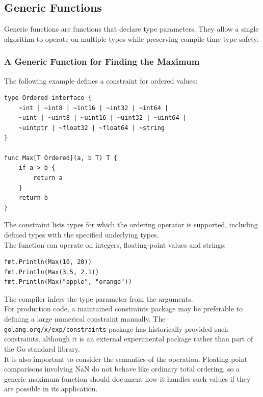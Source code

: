 \subsection{Generic Functions}

Generic functions are functions that declare type parameters. They allow a single algorithm to operate on multiple types while preserving compile-time type safety.

\subsubsection{A Generic Function for Finding the Maximum}

The following example defines a constraint for ordered values:

\begin{lstlisting}
type Ordered interface {
    ~int | ~int8 | ~int16 | ~int32 | ~int64 |
    ~uint | ~uint8 | ~uint16 | ~uint32 | ~uint64 |
    ~uintptr | ~float32 | ~float64 | ~string
}

func Max[T Ordered](a, b T) T {
    if a > b {
        return a
    }
    return b
}
\end{lstlisting}

The constraint lists types for which the ordering operator is supported, including defined types with the specified underlying types.\\

The function can operate on integers, floating-point values and strings:

\begin{lstlisting}
fmt.Println(Max(10, 20))
fmt.Println(Max(3.5, 2.1))
fmt.Println(Max("apple", "orange"))
\end{lstlisting}

The compiler infers the type parameter from the arguments.\\

For production code, a maintained constraints package may be preferable to defining a large numerical constraint manually. The \texttt{golang.org/x/exp/constraints} package has historically provided such constraints, although it is an external experimental package rather than part of the Go standard library.\\

It is also important to consider the semantics of the operation. Floating-point comparisons involving NaN do not behave like ordinary total ordering, so a generic maximum function should document how it handles such values if they are possible in its application.\\

